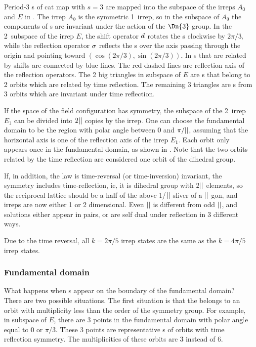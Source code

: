 Period-3 {\lattstate}s of cat map with $s=3$ are mapped into the subspace
of the irreps $A_0$ and $E$ in .
The irrep $A_0$ is the symmetric 1\dmn\ irrep, so in the subspace of $A_0$ the components
of {\lattstate}s are invariant under the action of the $\Dn{3}$ group.
In the 2\dmn\ subspace of the irrep $E$, the shift operator $d$ rotates the
{\lattstate}s clockwise by $2\pi/3$, while the reflection operator $\sigma$ reflects the {\lattstate}s
over the axis passing through the origin and pointing toward $(\cos(2\pi/3),\sin(2\pi/3))$.
In 
{\lattstate}s that are related by shifts are connected by blue lines.
The red dashed lines are reflection axis of the reflection operators.
The 2 big triangles in  subspace of $E$ are {\lattstate}s
that belong to 2 orbits which are related by time reflection. The remaining 3 triangles
are {\lattstate}s from 3 orbits which are invariant under time reflection.

If the space of the field configuration has \Dn{\cl{}} symmetry,
the subspace of the 2\dmn\ irrep $E_1$ can be divided
into $2{||}$ copies by the irrep. One can choose the fundamental domain to be the region
with polar angle between 0 and $\pi/{||}$, assuming that the horizontal axis is one of the
reflection axis of the irrep $E_1$. Each orbit only appears once in the fundamental domain,
as shown in . Note that the two orbits related by
the time reflection are considered one orbit of the dihedral group.

If, in addition, the law is time-reversal (or time-inversion) invariant,
the symmetry includes time-reflection, ie, it is dihedral group 
with 2${||}$ elements, so the reciprocal lattice should be a half of the
above 1/${||}$ sliver of a ${||}$-gon, and irreps are now either 1 or 2
dimensional. Even ${||}$ is different from odd ${||}$, and solutions either appear
in pairs, or are self dual under reflection in 3 different ways.

Due to the time
reversal, all $k={2\pi}/{5}$ irrep states are the same as the
$k={4\pi}/{5}$ irrep states.


\subsubsection{Fundamental domain}
What happens when {\lattstate}s appear on the boundary of the fundamental domain?
There are two possible situations. The first situation is that the {\lattstate} belongs to an
orbit with multiplicity less than the order of the symmetry group. For example,
in  subspace of $E$, there are 3 points in the fundamental domain
with polar angle equal to 0 or $\pi/3$. These 3 points are representative {\lattstate}s of orbits
with time reflection symmetry. The multiplicities of these orbits are 3 instead of 6.


